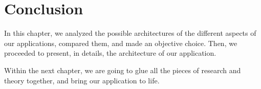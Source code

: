 \section{Conclusion}

In this chapter, we analyzed the possible architectures of the different aspects of our applications, compared them, and made an objective choice.
Then, we proceeded to present, in details, the architecture of our application.

Within the next chapter, we are going to glue all the pieces of research and theory together, and bring our application to life.